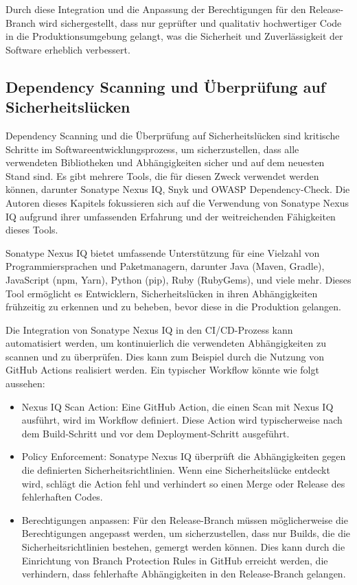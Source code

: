 Durch diese Integration und die Anpassung der Berechtigungen für den Release-Branch wird sichergestellt, dass nur geprüfter und qualitativ hochwertiger Code in die Produktionsumgebung gelangt, was die Sicherheit und Zuverlässigkeit der Software erheblich verbessert.


\subsection{Dependency Scanning und Überprüfung auf Sicherheitslücken}
Dependency Scanning und die Überprüfung auf Sicherheitslücken sind kritische Schritte im Softwareentwicklungsprozess, um sicherzustellen, dass alle verwendeten Bibliotheken und Abhängigkeiten sicher und auf dem neuesten Stand sind. Es gibt mehrere Tools, die für diesen Zweck verwendet werden können, darunter Sonatype Nexus IQ, Snyk und OWASP Dependency-Check. Die Autoren dieses Kapitels fokussieren sich auf die Verwendung von Sonatype Nexus IQ aufgrund ihrer umfassenden Erfahrung und der weitreichenden Fähigkeiten dieses Tools.

Sonatype Nexus IQ bietet umfassende Unterstützung für eine Vielzahl von Programmiersprachen und Paketmanagern, darunter Java (Maven, Gradle), JavaScript (npm, Yarn), Python (pip), Ruby (RubyGems), und viele mehr. Dieses Tool ermöglicht es Entwicklern, Sicherheitslücken in ihren Abhängigkeiten frühzeitig zu erkennen und zu beheben, bevor diese in die Produktion gelangen.

Die Integration von Sonatype Nexus IQ in den CI/CD-Prozess kann automatisiert werden, um kontinuierlich die verwendeten Abhängigkeiten zu scannen und zu überprüfen. Dies kann zum Beispiel durch die Nutzung von GitHub Actions realisiert werden. Ein typischer Workflow könnte wie folgt aussehen:

\begin{itemize}
\item Nexus IQ Scan Action: Eine GitHub Action, die einen Scan mit Nexus IQ ausführt, wird im Workflow definiert. Diese Action wird typischerweise nach dem Build-Schritt und vor dem Deployment-Schritt ausgeführt.
\item Policy Enforcement: Sonatype Nexus IQ überprüft die Abhängigkeiten gegen die definierten Sicherheitsrichtlinien. Wenn eine Sicherheitslücke entdeckt wird, schlägt die Action fehl und verhindert so einen Merge oder Release des fehlerhaften Codes.
\item Berechtigungen anpassen: Für den Release-Branch müssen möglicherweise die Berechtigungen angepasst werden, um sicherzustellen, dass nur Builds, die die Sicherheitsrichtlinien bestehen, gemergt werden können. Dies kann durch die Einrichtung von Branch Protection Rules in GitHub erreicht werden, die verhindern, dass fehlerhafte Abhängigkeiten in den Release-Branch gelangen.
\end{itemize}